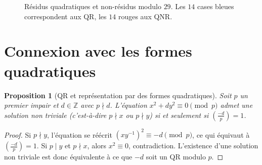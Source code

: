 \documentclass[12pt,a4paper,openany]{book}
\theoremstyle{definition}
\theoremstyle{plain}
\newtheorem{proposition}[definition]{Proposition}
\theoremstyle{remark}
\newcommand{\Z}{\mathbb{Z}}
\newcommand{\legendre}[2]{\left(\frac{#1}{#2}\right)}
\begin{document}
\begin{figure}[ht]
\centering
{}
\caption{Résidus quadratiques et non-résidus modulo $29$.
Les $14$ cases bleues correspondent aux QR, les $14$ rouges aux QNR.}
\label{fig:qr-pattern-29}
\end{figure}

\section{Connexion avec les formes quadratiques}
\label{sec:qr:formes-quadratiques}

\begin{proposition}[QR et représentation par des formes quadratiques]
\label{prop:qr-formes}
Soit $p$ un premier impair et $d \in \Z$ avec $p \nmid d$. L'équation
$x^2 + dy^2 \equiv 0 \pmod{p}$ admet une solution non triviale (c'est-à-dire
$p \nmid x$ ou $p \nmid y$) si et seulement si $\legendre{-d}{p} = 1$.
\end{proposition}

\begin{proof}
Si $p \nmid y$, l'équation se réécrit $(xy^{-1})^2 \equiv -d \pmod{p}$,
ce qui équivaut à $\legendre{-d}{p} = 1$. Si $p \mid y$ et $p \nmid x$,
alors $x^2 \equiv 0$, contradiction. L'existence d'une solution non triviale
est donc équivalente à ce que $-d$ soit un QR modulo $p$.
\end{proof}
\end{document}
